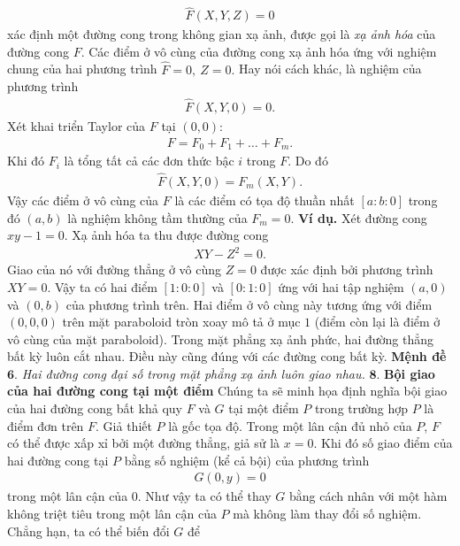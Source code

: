 \begin{multicols}{2}
\begin{align*}
		\widehat F(X,Y,Z)=0
	\end{align*}
	xác định một đường cong trong không gian xạ ảnh, được gọi là  {\em xạ ảnh hóa} của đường cong $F$. 
	\vskip 0.1cm
	Các điểm ở vô cùng của đường cong xạ ảnh hóa ứng với nghiệm chung của hai  phương trình 
	$\widehat F=0,\ Z=0.$
	Hay nói cách khác, là nghiệm của phương trình
	\begin{align*}
		\widehat F(X,Y,0)=0.
	\end{align*}
	Xét khai triển Taylor của $F$ tại $(0,0)$:
	\begin{align*}
		F=F_0+F_1+\ldots + F_m.
	\end{align*}
	Khi đó $F_i$ là tổng tất cả các đơn thức bậc $i$ trong $F$. Do đó 
	\begin{align*}
		\widehat F(X,Y,0)= F_m(X,Y).
	\end{align*}
	Vậy các điểm ở vô cùng của $F$  là các điểm có tọa độ thuần nhất $[a:b:0]$ trong đó $(a,b)$ là nghiệm không tầm thường của $F_m=0$.
	\vskip 0.1cm
	\textbf{\color{duongvaotoanhoc}Ví dụ.} Xét đường cong $xy-1=0$. Xạ ảnh hóa ta thu được đường cong
	\begin{align*}
		XY-Z^2=0.
	\end{align*}
	Giao của nó với đường thẳng ở vô cùng $Z=0$ được xác định bởi phương trình
	$XY=0.$
	Vậy ta có hai điểm $[1:0:0]$ và $[0:1:0]$ ứng với hai tập nghiệm $(a,0)$ và $(0,b)$ của phương trình trên. Hai điểm ở vô cùng này tương ứng với điểm $(0,0,0)$ trên mặt paraboloid tròn xoay mô tả ở mục $1$ (điểm còn lại là điểm ở vô cùng của mặt paraboloid).   
	\vskip 0.1cm
	Trong mặt phẳng xạ ảnh phức, hai đường thẳng bất kỳ luôn cắt nhau. Điều này cũng đúng với các đường cong bất kỳ. 
	\vskip 0.1cm
	\textbf{\color{duongvaotoanhoc}Mệnh đề} $\pmb{6.}$
	\textit{Hai đường cong đại số trong mặt phẳng xạ ảnh luôn giao nhau.}
	\vskip 0.1cm
	$\pmb{8.}$ \textbf{\color{duongvaotoanhoc}Bội giao của hai đường cong tại một điểm} 
	\vskip 0.1cm 
	Chúng ta sẽ minh họa định nghĩa bội giao của hai đường cong bất khả quy $F$  và $G$  tại một điểm $P$ trong trường hợp $P$ là điểm đơn trên $F$.  Giả thiết $P$ là gốc tọa độ. Trong một lân cận đủ nhỏ của $P$, $F$  có thể được xấp xỉ bởi một đường thẳng, giả sử là $x=0$. Khi đó số giao điểm của hai đường cong tại $P$ bằng số nghiệm (kể cả bội) của phương trình 
	\begin{align*}
		G(0,y)=0
	\end{align*}
	trong một lân cận của $0$. Như vậy ta có thể thay $G$ bằng cách nhân với một hàm không triệt tiêu trong một lân cận của $P$ mà không làm thay đổi số nghiệm. Chẳng hạn, ta có thể biến đổi $G$ để 

\end{multicols}
